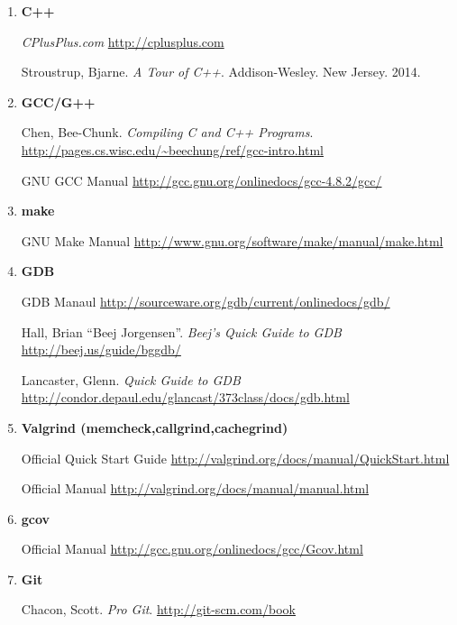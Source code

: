 \documentclass[10pt]{article}
\begin{document}
\begin{enumerate}
\begin{itemize}
\end{itemize}

\item \textbf{C++}

\textit{CPlusPlus.com} 
\newline \url{http://cplusplus.com}
\vspace{.25in}

Stroustrup, Bjarne. \textit{A Tour of C++}. Addison-Wesley. New Jersey. 2014.  

\item \textbf{GCC/G++}

Chen, Bee-Chunk. \textit{Compiling C and C++ Programs}.
\newline \url{http://pages.cs.wisc.edu/~beechung/ref/gcc-intro.html}
\vspace{.25in}

GNU GCC Manual \newline
\url{http://gcc.gnu.org/onlinedocs/gcc-4.8.2/gcc/}

\item \textbf{make}

GNU Make Manual \newline
\url{http://www.gnu.org/software/make/manual/make.html}

\item \textbf{GDB}

GDB Manaul \newline
\url{http://sourceware.org/gdb/current/onlinedocs/gdb/}
\vspace{.25in}

Hall, Brian ``Beej Jorgensen''. \textit{Beej's Quick Guide to GDB} \newline
\url{http://beej.us/guide/bggdb/}
\vspace{.25in}

Lancaster, Glenn. \textit{Quick Guide to GDB} \newline
\url{http://condor.depaul.edu/glancast/373class/docs/gdb.html}
\vspace{.25in}

\item \textbf{Valgrind (memcheck,callgrind,cachegrind)}

Official Quick Start Guide \newline
\url{http://valgrind.org/docs/manual/QuickStart.html}
\vspace{.25in}

Official Manual \newline
\url{http://valgrind.org/docs/manual/manual.html}

\item \textbf{gcov}

Official Manual \newline
\url{http://gcc.gnu.org/onlinedocs/gcc/Gcov.html}

\item \textbf{Git}

Chacon, Scott. \textit{Pro Git}. \url{http://git-scm.com/book}


\end{enumerate}
\end{document}
